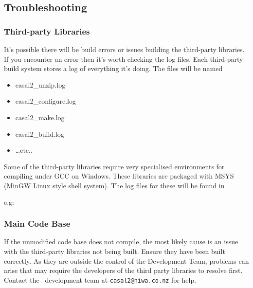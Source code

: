 \subsection{Troubleshooting}

\subsubsection{Third-party Libraries}

It’s possible there will be build errors or issues building the third-party libraries. If you encounter an error then it’s worth checking the log files. Each third-party build system stores a log of everything it’s doing. The files will be named

\begin{itemize}
	\item casal2\_unzip.log
	\item casal2\_configure.log
	\item casal2\_make.log
	\item casal2\_build.log
	\item \dots etc,.
\end{itemize}

Some of the third-party libraries require very specialised environments for compiling under GCC on Windows. These libraries are packaged with MSYS (MinGW Linux style shell system). The log files for these will be found in 

e.g: 

\subsubsection{Main Code Base}

If the unmodified code base does not compile, the most likely cause is an issue with the third-party libraries not being built. Ensure they have been built correctly. As they are outside the control of the Development Team, problems can arise that may require the developers of the third party libraries to resolve first. Contact the \CNAME\ development team at \texttt{casal2@niwa.co.nz} for help.



